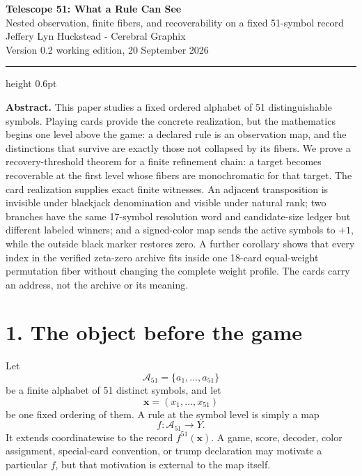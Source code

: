 \documentclass[9pt]{extarticle}
\theoremstyle{cgplain}
\theoremstyle{definition}
\newcommand{\A}{\mathcal A_{51}}
\begin{document}
\fontsize{9.1}{10.65}\selectfont

\begin{center}
{\Large\bfseries\color{cgblue} Telescope 51: What a Rule Can See}\\[0.35em]
{\large Nested observation, finite fibers, and recoverability on a fixed 51-symbol record}\\[0.7em]
{\normalsize Jeffery Lyn Huckstead - Cerebral Graphix}\\[-0.1em]
{\small Version 0.2 working edition, 20 September 2026}
\end{center}
\vspace{0.25em}
\hrule height 0.6pt \vspace{0.55em}

\textbf{Abstract.}
This paper studies a fixed ordered alphabet of 51 distinguishable symbols. Playing cards provide the concrete realization, but the mathematics begins one level above the game: a declared rule is an observation map, and the distinctions that survive are exactly those not collapsed by its fibers. We prove a recovery-threshold theorem for a finite refinement chain: a target becomes recoverable at the first level whose fibers are monochromatic for that target. The card realization supplies exact finite witnesses. An adjacent transposition is invisible under blackjack denomination and visible under natural rank; two branches have the same 17-symbol resolution word and candidate-size ledger but different labeled winners; and a signed-color map sends the active symbols to $+1$, while the outside black marker restores zero. A further corollary shows that every index in the verified zeta-zero archive fits inside one 18-card equal-weight permutation fiber without changing the complete weight profile. The cards carry an address, not the archive or its meaning.

\section*{1. The object before the game}
Let
\[
\A=\{a_1,\ldots,a_{51}\}
\]
be a finite alphabet of 51 distinct symbols, and let
\[
\mathbf{x}=(x_1,\ldots,x_{51})
\]
be one fixed ordering of them. A rule at the symbol level is simply a map
\[
f:\A\longrightarrow Y.
\]
It extends coordinatewise to the record $f^{51}(\mathbf{x})$. A game, score, decoder, color assignment, special-card convention, or trump declaration may motivate a particular $f$, but that motivation is external to the map itself.
\end{document}
